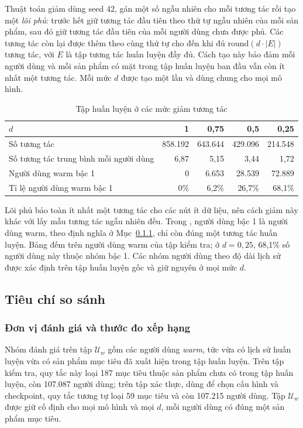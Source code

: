 Thuật toán giảm dùng seed 42, gán một số ngẫu nhiên cho mỗi tương tác rồi tạo một \emph{lõi phủ}: trước hết giữ tương tác đầu tiên theo thứ tự ngẫu nhiên của mỗi sản phẩm, sau đó giữ tương tác đầu tiên của mỗi người dùng chưa được phủ. Các tương tác còn lại được thêm theo cùng thứ tự cho đến khi đủ $\mathrm{round}(d\cdot|E|)$ tương tác, với $E$ là tập tương tác huấn luyện đầy đủ. Cách tạo này bảo đảm mỗi người dùng và mỗi sản phẩm có mặt trong tập huấn luyện ban đầu vẫn còn ít nhất một tương tác. Mỗi mức $d$ được tạo một lần và dùng chung cho mọi mô hình.

\begin{table}[H]
\centering
\begin{tabular}{@{}lrrrr@{}}
\toprule
$d$ & 1 & 0,75 & 0,5 & 0,25 \\
\midrule
Số tương tác & 858.192 & 643.644 & 429.096 & 214.548 \\
Số tương tác trung bình mỗi người dùng & 6,87 & 5,15 & 3,44 & 1,72 \\
Người dùng warm bậc 1 & 0 & 6.653 & 28.539 & 72.889 \\
Tỉ lệ người dùng warm bậc 1 & 0\% & 6,2\% & 26,7\% & 68,1\% \\
\bottomrule
\end{tabular}
\caption{Tập huấn luyện ở các mức giảm tương tác}
\label{tab:sparsity}
\end{table}

Lõi phủ bảo toàn ít nhất một tương tác cho các nút ít dữ liệu, nên cách giảm này khác với lấy mẫu tương tác ngẫu nhiên đều. Trong , người dùng bậc 1 là người dùng warm, theo định nghĩa ở Mục~\ref{sec:evaluation-unit}, chỉ còn đúng một tương tác huấn luyện. Bảng đếm trên người dùng warm của tập kiểm tra; ở $d=0{,}25$, 68,1\% số người dùng này thuộc nhóm bậc 1. Các nhóm người dùng theo độ dài lịch sử được xác định trên tập huấn luyện gốc và giữ nguyên ở mọi mức $d$.

\subsection{Tiêu chí so sánh}
\label{sec:criteria}

\subsubsection{Đơn vị đánh giá và thước đo xếp hạng}
\label{sec:evaluation-unit}

Nhóm đánh giá trên tập $\mathcal{U}_w$ gồm các người dùng \emph{warm}, tức vừa có lịch sử huấn luyện vừa có sản phẩm mục tiêu đã xuất hiện trong tập huấn luyện. Trên tập kiểm tra, quy tắc này loại 187 mục tiêu thuộc sản phẩm chưa có trong tập huấn luyện, còn 107.087 người dùng; trên tập xác thực, dùng để chọn cấu hình và checkpoint, quy tắc tương tự loại 59 mục tiêu và còn 107.215 người dùng. Tập $\mathcal{U}_w$ được giữ cố định cho mọi mô hình và mọi $d$, mỗi người dùng có đúng một sản phẩm mục tiêu.


